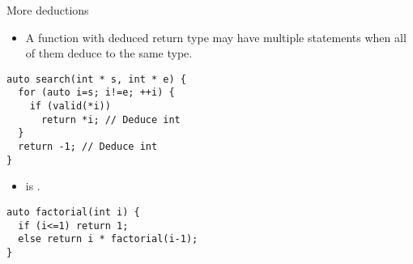 \begin{frame}[fragile]{More deductions}
\begin{itemize}
  \item A function with deduced return type may have
        multiple  statements when all of them
        deduce to the same type.
\end{itemize}
\begin{lstlisting}
auto search(int * s, int * e) {
  for (auto i=s; i!=e; ++i) {
    if (valid(*i))
      return *i; // Deduce int
  }
  return -1; // Deduce int
}
\end{lstlisting}

\begin{itemize}
  \pause
  \item {} is .
\end{itemize}
\begin{lstlisting}
auto factorial(int i) {
  if (i<=1) return 1;
  else return i * factorial(i-1);
}
\end{lstlisting}
\end{frame}
